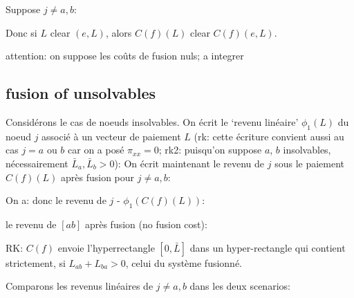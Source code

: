 \documentclass[11pt,oneside,twocolumn]{article}
\begin{document}
Suppose $j\neq a, b$:


Donc si $L$ clear $(e,L)$,
alors $C(f)(L)$ clear
$C(f)(e,L)$.

attention: on suppose les co\^uts de fusion nuls; a integrer

\subsection{fusion of unsolvables}
Considérons le cas de noeuds insolvables.
On écrit le `revenu linéaire' $\phi_1(L)$ du noeud $j$ associé à un vecteur de paiement $L$ (rk: cette écriture convient aussi au cas $j=a$ ou $b$ car on a posé $\pi_{xx}=0$; rk2: puisqu'on suppose  $a$, $b$ insolvables, nécessairement $\bar L_a,\bar L_b>0$):
On écrit maintenant le revenu de $j$
sous le paiement $C(f)(L)$ après fusion pour $j\neq a,b$:

On a:
donc le revenu de $j$ -
$\phi_1(C(f)(L))$:

le revenu de $[ab]$ après fusion (no fusion cost):

RK: $C(f)$ envoie l'hyperrectangle $[0,\bar L]$
dans un hyper-rectangle qui
contient strictement, si
$L_{ab}+L_{ba}>0$, celui du système fusionné.

Comparons les revenus linéaires de $j\neq a,b$ dans les deux scenarios:

\end{document}

